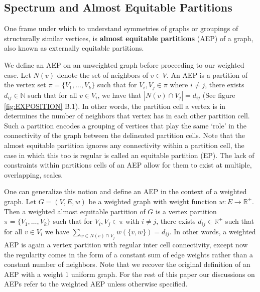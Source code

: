 \documentclass[%
 aip,
 amsmath,amssymb,
preprint,
reprint, onecolumn %
]{revtex4-1}
\newcommand{\R}{\mathbb{R}}
\newcommand{\N}{\mathbb{N}}
\begin{document}
\subsection{Spectrum and Almost Equitable Partitions}\label{sec:graphMat}

One frame under which to understand symmetries of graphs or groupings of structurally similar vertices, is \textbf{almost equitable partitions} (AEP) of a graph, also known as externally equitable partitions. 

We define an AEP on an unweighted graph before proceeding to our weighted case. Let $N(v)$ denote the set of neighbors of $v\in V$. An AEP is a partition of the vertex set $\pi=\{V_1,\dots,V_k\}$ such that for $V_i, V_j\in \pi$ where $i\neq j$, there exists $d_{ij}\in \N$ such that for all $v\in V_i$, we have that $|N(v)\cap V_j|=d_{ij}$ (See figure \ref{fig:EXPOSITION} B.1). In other words, the partition cell a vertex is in determines the number of neighbors that vertex has in each other partition cell. Such a partition encodes a grouping of vertices that play the same `role' in the connectivity of the graph between the delineated partition cells. Note that the almost equitable partition ignores any connectivity within a partition cell, the case in which this too is regular is called an equitable partition (EP). The lack of constraints within partitions cells of an AEP allow for them to exist at multiple, overlapping, scales. 

One can generalize this notion and define an AEP in the context of a weighted graph.\cite{abiad_characterizing_2022} Let $G=(V,E,w)$ be a weighted graph with weight function $w:E\to\R^+$. Then a weighted almost equitable partition of $G$ is a vertex partition $\pi=\{V_1,\dots,V_k\}$ such that for $V_i, V_j\in \pi$ with $i\neq j$, there exists $d_{ij}\in \R^+$ such that for all $v\in V_i$ we have $\sum_{w\in N(v) \cap V_j} w(\{v,w\}) =d_{ij}$. In other words, a weighted AEP is again a vertex partition with regular inter cell connectivity, except now the regularity comes in the form of a constant sum of edge weights rather than a constant number of neighbors. Note that we recover the original definition of an AEP with a weight $1$ uniform graph. For the rest of this paper our discussions on AEPs refer to the weighted AEP unless otherwise specified.
\end{document}

